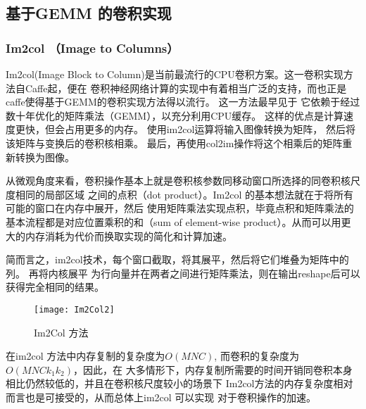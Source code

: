 \subsection{基于GEMM 的卷积实现}

\subsubsection{Im2col （Image to Columns）}

Im2col(Image Block to Column)是当前最流行的CPU卷积方案。这一卷积实现方法自Caffe\cite{Jia2014CaffeCA}起，便在
卷积神经网络计算的实现中有着相当广泛的支持，而也正是caffe使得基于GEMM的卷积实现方法得以流行。
这一方法最早见于\cite{Chellapilla2006HighPC} 它依赖于经过数十年优化的矩阵乘法（GEMM），以充分利用CPU缓存。
这样的优点是计算速度更快，但会占用更多的内存。 使用im2col运算将输入图像转换为矩阵，
然后将该矩阵与变换后的卷积核相乘。 最后，再使用col2im操作将这个相乘后的矩阵重新转换为图像。

从微观角度来看，卷积操作基本上就是卷积核参数同移动窗口所选择的同卷积核尺度相同的局部区域
之间的点积（dot product）。Im2col 的基本想法就在于将所有可能的窗口在内存中展开，然后
使用矩阵乘法实现点积，毕竟点积和矩阵乘法的基本流程都是对应位置乘积的和（sum of element-wise
product）。从而可以用更大的内存消耗为代价而换取实现的简化和计算加速。

简而言之，im2col技术，每个窗口截取，将其展平，然后将它们堆叠为矩阵中的列。 再将内核展平
为行向量并在两者之间进行矩阵乘法，则在输出reshape后可以获得完全相同的结果。
\begin{figure}
	\centering
	\texttt{[image: Im2Col2]}
	\caption{Im2Col 方法}
	\label{fig:im2col}
\end{figure}

% 
% 

在im2col 方法中内存复制的复杂度为$O(MNC)$, 而卷积的复杂度为 $O(MNCk_1k_2)$，因此，在
大多情形下，内存复制所需要的时间开销同卷积本身相比仍然较低的，并且在卷积核尺度较小的场景下
Im2col方法的内存复杂度相对而言也是可接受的，从而总体上im2col 可以实现
对于卷积操作的加速。


